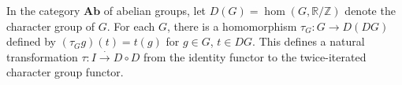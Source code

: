 In the category $\mathbf{Ab}$ of abelian groups, let $D(G) = \hom(G, \mathbb{R}/\mathbb{Z})$ denote the character group of $G$. For each $G$, there is a homomorphism $\tau_G: G \rightarrow D(DG)$ defined by $(\tau_G g)(t) = t(g)$ for $g \in G$, $t \in DG$. This defines a natural transformation $\tau: I \xrightarrow{\cdot} D \circ D$ from the identity functor to the twice-iterated character group functor.